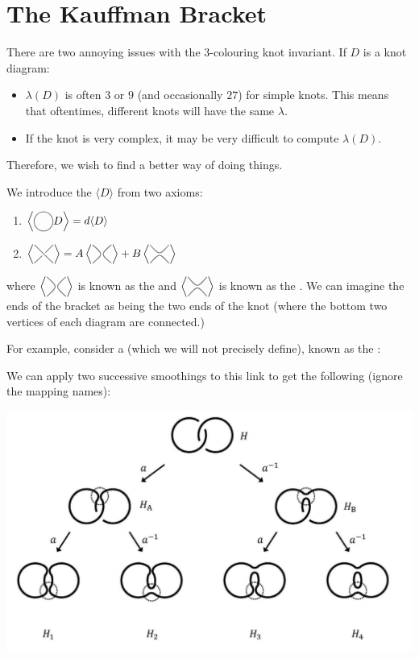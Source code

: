 \documentclass{article}
\begin{document}
\section{The Kauffman Bracket}
There are two annoying issues with the 3-colouring knot invariant. If $D$ is a knot diagram:
\begin{itemize}
    \item $\lambda(D)$ is often $3$ or $9$ (and occasionally $27$) for simple knots. This means that oftentimes, different knots will have the same $\lambda$.
    \item If the knot is very complex, it may be very difficult to compute $\lambda(D).$
\end{itemize}
Therefore, we wish to find a better way of doing things.
\begin{definition}
    We introduce the  $\langle D\rangle$ from two axioms:
    \begin{enumerate}
        \item $\left\langle\KPA D\right\rangle=d\langle D\rangle$
        
        \item $\left\langle\KPB\right\rangle=
        A\left\langle\KPD\right\rangle + B \left\langle \KPC \right\rangle$
    \end{enumerate}
    where $\left\langle\KPD\right\rangle$ is known as the  and $\left\langle \KPC\right\rangle$ is known as the . We can imagine the ends of the bracket as being the two ends of the knot (where the bottom two vertices of each diagram are connected.)
\end{definition}
For example, consider a  (which we will not precisely define), known as the :
\begin{center}
\end{center}
We can apply two successive smoothings to this link to get the following (ignore the mapping names):
\begin{center}
    \includegraphics[width=0.5\linewidth]{figures/hopf_link_bracket.png}
\end{center}
\end{document}
